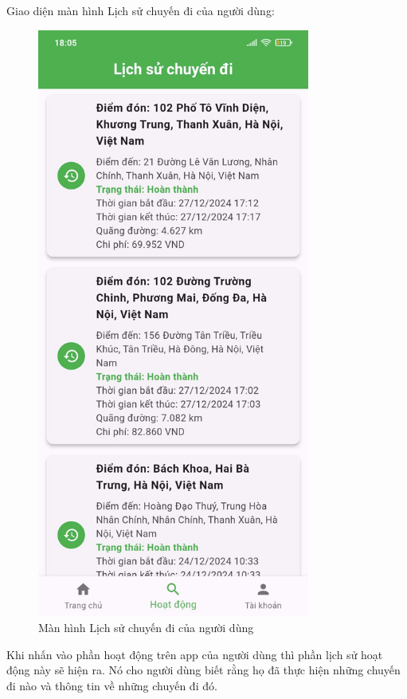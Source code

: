 \documentclass[../DoAn.tex]{subfiles}
\begin{document}
Giao diện màn hình Lịch sử chuyến đi của người dùng:
\begin{figure}[H]
    \centering
    \includegraphics[width=0.8\textwidth]{Hinhve/Lich_su_chuyen_di_nguoi_dung.png}
    \caption{Màn hình Lịch sử chuyến đi của người dùng}
    \label{fig:Lich_su_chuyen_di_nguoi_dung}
\end{figure}

Khi nhấn vào phần hoạt động trên app của người dùng thì phần lịch sử hoạt động này sẽ hiện ra.
Nó cho người dùng biết rằng họ đã thực hiện những chuyến đi nào và thông tin về những chuyến đi đó.
\end{document}
